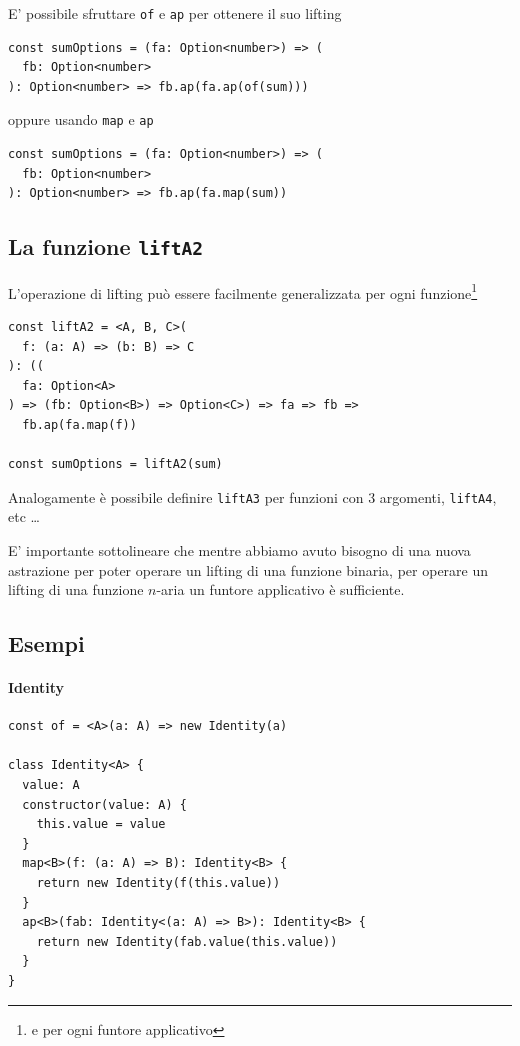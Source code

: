 \documentclass[12pt]{article}
\begin{document}
E' possibile sfruttare \texttt{of} e \texttt{ap} per ottenere il suo lifting

\begin{verbatim}
const sumOptions = (fa: Option<number>) => (
  fb: Option<number>
): Option<number> => fb.ap(fa.ap(of(sum)))
\end{verbatim}

oppure usando \texttt{map} e \texttt{ap}

\begin{verbatim}
const sumOptions = (fa: Option<number>) => (
  fb: Option<number>
): Option<number> => fb.ap(fa.map(sum))
\end{verbatim}

\subsection{La funzione \texttt{liftA2}}

L'operazione di lifting può essere facilmente generalizzata per ogni funzione\footnote{e per ogni funtore applicativo}

\begin{verbatim}
const liftA2 = <A, B, C>(
  f: (a: A) => (b: B) => C
): ((
  fa: Option<A>
) => (fb: Option<B>) => Option<C>) => fa => fb =>
  fb.ap(fa.map(f))

const sumOptions = liftA2(sum)
\end{verbatim}

Analogamente è possibile definire \texttt{liftA3} per funzioni con 3 argomenti, \texttt{liftA4}, etc \ldots

E' importante sottolineare che mentre abbiamo avuto bisogno di una nuova astrazione per poter operare un lifting di una funzione binaria,
per operare un lifting di una funzione $n$-aria un funtore applicativo è sufficiente.

\subsection{Esempi}

\paragraph{Identity}

\begin{verbatim}
const of = <A>(a: A) => new Identity(a)

class Identity<A> {
  value: A
  constructor(value: A) {
    this.value = value
  }
  map<B>(f: (a: A) => B): Identity<B> {
    return new Identity(f(this.value))
  }
  ap<B>(fab: Identity<(a: A) => B>): Identity<B> {
    return new Identity(fab.value(this.value))
  }
}
\end{verbatim}
\end{document}
